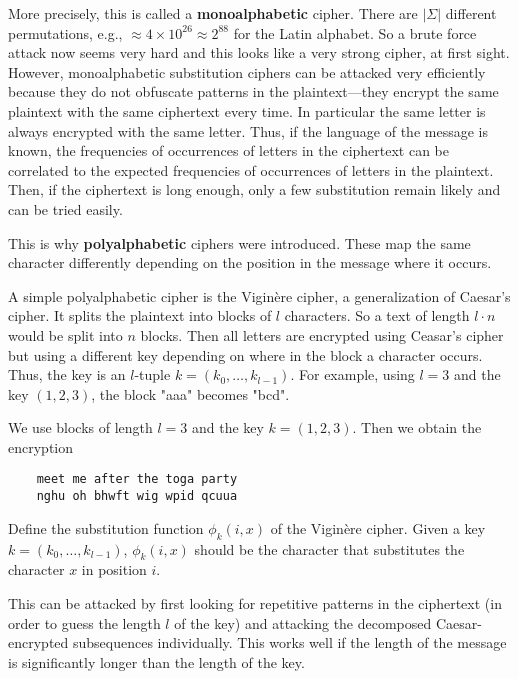 More precisely, this is called a \textbf{monoalphabetic} cipher.
There are $|\Sigma|$ different permutations, e.g., $\approx 4\times 10^{26}\approx 2^{88}$ for the Latin alphabet.
So a brute force attack now seems very hard and this looks like a very strong cipher, at first sight. 
However, monoalphabetic substitution ciphers can be attacked very efficiently because they do not obfuscate patterns in the plaintext---they encrypt the same plaintext with the same ciphertext every time.
In particular the same letter is always encrypted with the same letter. 
Thus, if the language of the message is known, the frequencies of occurrences of letters in the ciphertext can be correlated to the expected frequencies of occurrences of letters in the plaintext.
Then, if the ciphertext is long enough, only a few substitution remain likely and can be tried easily.

This is why \textbf{polyalphabetic} ciphers were introduced.
These map the same character differently depending on the position in the message where it occurs.

A simple polyalphabetic cipher is the Vigin\`ere cipher, a generalization of Caesar's cipher.
It splits the plaintext into blocks of $l$ characters.
So a text of length $l\cdot n$ would be split into $n$ blocks.
Then all letters are encrypted using Ceasar's cipher but using a different key depending on where in the block a character occurs.
Thus, the key is an $l$-tuple $k=(k_0,\ldots,k_{l-1})$.
For example, using $l=3$ and the key $(1,2,3)$, the block "aaa" becomes "bcd". 

\begin{example}
 We use blocks of length $l=3$ and the key $k=(1,2,3)$.
 Then we obtain the encryption
  \begin{lstlisting}
    meet me after the toga party
    nghu oh bhwft wig wpid qcuua
  \end{lstlisting}
\end{example}

\begin{exercise}\label{exc:sd:viginere}
Define the substitution function $\phi_k(i,x)$ of the Vigin\`ere cipher.
Given a key $k=(k_0,\ldots,k_{l-1})$, $\phi_k(i,x)$ should be the character that substitutes the character $x$ in position $i$.
\end{exercise}

This can be attacked by first looking for repetitive patterns in the ciphertext (in order to guess the length $l$ of the key) and attacking the decomposed Caesar-encrypted subsequences individually.
This works well if the length of the message is significantly longer than the length of the key. 


